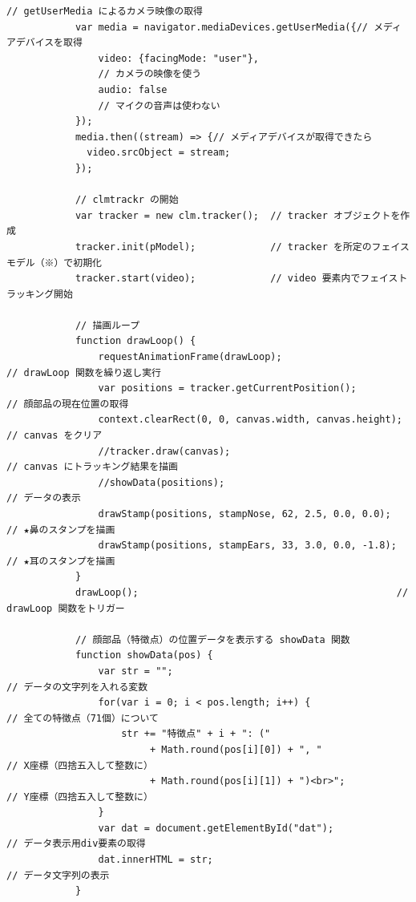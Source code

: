 \documentclass[mingoth,11pt,a4j,uplatex]{jsarticle}
\begin{document}
\begin{lstlisting}[caption=07-04.html]
            // getUserMedia によるカメラ映像の取得
            var media = navigator.mediaDevices.getUserMedia({// メディアデバイスを取得
                video: {facingMode: "user"},                          
                // カメラの映像を使う
                audio: false                                          
                // マイクの音声は使わない
            });
            media.then((stream) => {// メディアデバイスが取得できたら
              video.srcObject = stream;
            });
            
            // clmtrackr の開始
            var tracker = new clm.tracker();  // tracker オブジェクトを作成
            tracker.init(pModel);             // tracker を所定のフェイスモデル（※）で初期化
            tracker.start(video);             // video 要素内でフェイストラッキング開始

            // 描画ループ
            function drawLoop() {
                requestAnimationFrame(drawLoop);                      // drawLoop 関数を繰り返し実行
                var positions = tracker.getCurrentPosition();         // 顔部品の現在位置の取得
                context.clearRect(0, 0, canvas.width, canvas.height); // canvas をクリア
                //tracker.draw(canvas);                                 // canvas にトラッキング結果を描画
                //showData(positions);                                  // データの表示
                drawStamp(positions, stampNose, 62, 2.5, 0.0, 0.0);   // ★鼻のスタンプを描画
                drawStamp(positions, stampEars, 33, 3.0, 0.0, -1.8);  // ★耳のスタンプを描画
            }
            drawLoop();                                             // drawLoop 関数をトリガー
            
            // 顔部品（特徴点）の位置データを表示する showData 関数
            function showData(pos) {
                var str = "";                                         // データの文字列を入れる変数
                for(var i = 0; i < pos.length; i++) {                 // 全ての特徴点（71個）について
                    str += "特徴点" + i + ": ("
                         + Math.round(pos[i][0]) + ", "                 // X座標（四捨五入して整数に）
                         + Math.round(pos[i][1]) + ")<br>";             // Y座標（四捨五入して整数に）
                }
                var dat = document.getElementById("dat");             // データ表示用div要素の取得
                dat.innerHTML = str;                                  // データ文字列の表示
            }


\end{lstlisting}
\end{document}
